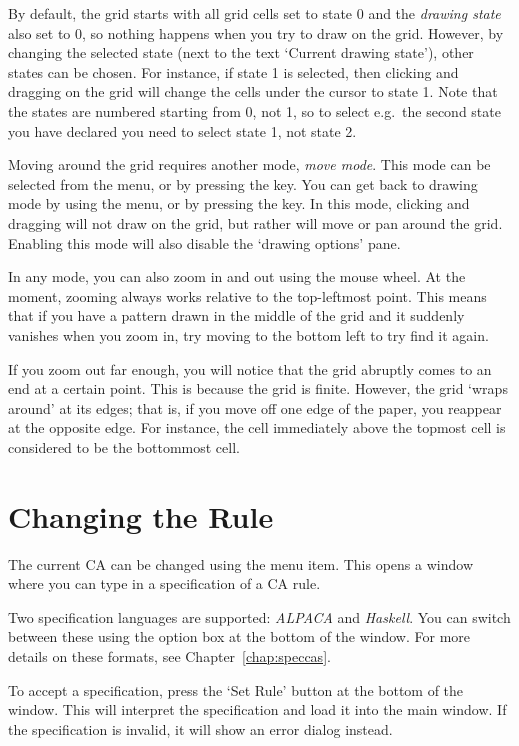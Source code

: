 \documentclass[oneside,a4paper]{memoir}
\begin{document}
By default, the grid starts with all grid cells set to state 0 and the \emph{drawing state} also set to 0,
  so nothing happens when you try to draw on the grid.
However, by changing the selected state (next to the text `Current drawing state'), other states can be chosen.
For instance, if state 1 is selected, then clicking and dragging on the grid will change the cells under the cursor to state 1.
Note that the states are numbered starting from 0, not 1,
  so to select e.g.\ the second state you have declared you need to select state 1, not state 2.

Moving around the grid requires another mode, \emph{move mode}.
This mode can be selected from the  menu, or by pressing the  key.
You can get back to drawing mode by using the  menu, or by pressing the  key.
In this mode, clicking and dragging will not draw on the grid, but rather will move or pan around the grid.
Enabling this mode will also disable the `drawing options' pane.

In any mode, you can also zoom in and out using the mouse wheel.
At the moment, zooming always works relative to the top-leftmost point.
This means that if you have a pattern drawn in the middle of the grid and it suddenly vanishes when you zoom in,
  try moving to the bottom left to try find it again.

If you zoom out far enough, you will notice that the grid abruptly comes to an end at a certain point.
This is because the grid is finite.
However, the grid `wraps around' at its edges; that is, if you move off one edge of the paper, you reappear at the opposite edge.
For instance, the cell immediately above the topmost cell is considered to be the bottommost cell.

\section{Changing the Rule}
\label{sec:chngrule}

The current CA can be changed using the  menu item.
This opens a window where you can type in a specification of a CA rule.

Two specification languages are supported: \emph{ALPACA} and \emph{Haskell}.
You can switch between these using the option box at the bottom of the window.
For more details on these formats, see Chapter~\ref{chap:speccas}.

To accept a specification, press the `Set Rule' button at the bottom of the window.
This will interpret the specification and load it into the main window.
If the specification is invalid, it will show an error dialog instead.
\end{document}

